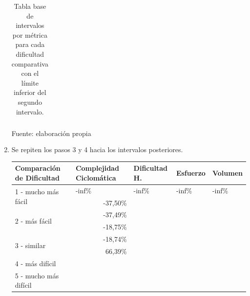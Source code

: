\documentclass[letterpaper,12pt]{article}
\begin{document}
\begin{enumerate}
\begin{table}[H]
\begin{tabular}{|l|l|l|l|l|}
          \end{tabular}
          \caption{Tabla base de intervalos por métrica para cada dificultad comparativa con el límite inferior del segundo intervalo.} Fuente: elaboración propia
          \label{tab:base-int-table-2}
        \end{table}
  \item Se repiten los pasos 3 y 4 hacia los intervalos posteriores.
        \begin{table}[H]
          \centering
          \begin{tabular}{|l|l|l|l|l|}
            \hline
            \textbf{Comparación de Dificultad}     & \textbf{Complejidad Ciclomática} & \textbf{Dificultad H.} & \textbf{Esfuerzo} & \textbf{Volumen} \\ \hline
            \multirow{2}{*}{1 - mucho más fácil}   & -inf\%                           & -inf\%                 & -inf\%            & -inf\%           \\ \cline{2-5}
                                                   & \multicolumn{1}{r|}{-37,50\%}    &                        &                   &                  \\ \hline
            \multirow{2}{*}{2 - más fácil}         & \multicolumn{1}{r|}{-37,49\%}    &                        &                   &                  \\ \cline{2-5}
                                                   & \multicolumn{1}{r|}{-18,75\%}    &                        &                   &                  \\ \hline
            \multirow{2}{*}{3 - similar}           & \multicolumn{1}{r|}{-18,74\%}    &                        &                   &                  \\ \cline{2-5}
                                                   & \multicolumn{1}{r|}{66,39\%}     &                        &                   &                  \\ \hline
            \multirow{2}{*}{4 - más difícil}       &                                  &                        &                   &                  \\ \cline{2-5}
                                                   &                                  &                        &                   &                  \\ \hline
            \multirow{2}{*}{5 - mucho más difícil} &                                  &                        &                   &                  \\ \cline{2-5}

\end{tabular}
\end{table}
\end{enumerate}
\end{document}
